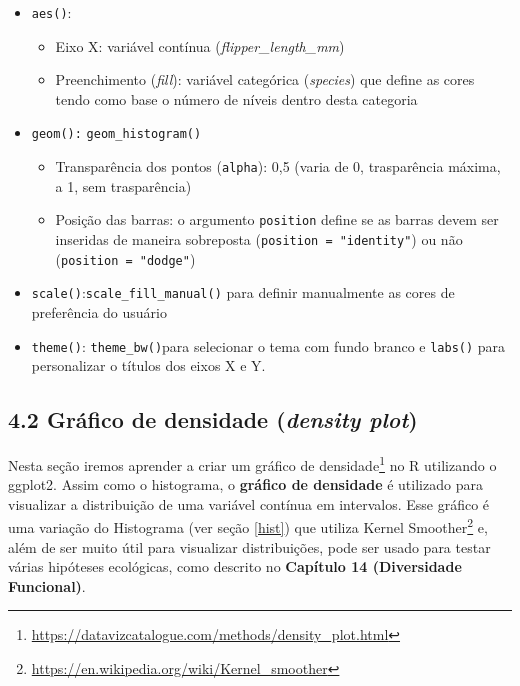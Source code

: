 \documentclass[
]{book}
\renewcommand{\href}[2]{#2\footnote{\url{#1}}}
\begin{document}
\begin{itemize}
\item
  \texttt{aes()}:

  \begin{itemize}
  \item
    Eixo X: variável contínua (\emph{flipper\_length\_mm})
  \item
    Preenchimento (\emph{fill}): variável categórica (\emph{species}) que define as cores tendo como base o número de níveis dentro desta categoria
  \end{itemize}
\item
  \texttt{geom():} \texttt{geom\_histogram()}

  \begin{itemize}
  \item
    Transparência dos pontos (\texttt{alpha}): 0,5 (varia de 0, trasparência máxima, a 1, sem trasparência)
  \item
    Posição das barras: o argumento \texttt{position} define se as barras devem ser inseridas de maneira sobreposta (\texttt{position\ =\ "identity"}) ou não (\texttt{position\ =\ "dodge"})
  \end{itemize}
\item
  \texttt{scale()}:\texttt{scale\_fill\_manual()} para definir manualmente as cores de preferência do usuário
\item
  \texttt{theme()}: \texttt{theme\_bw()}para selecionar o tema com fundo branco e \texttt{labs()} para personalizar o títulos dos eixos X e Y.
\end{itemize}

\hypertarget{gruxe1fico-de-densidade-density-plot}{%
\subsection{\texorpdfstring{4.2 Gráfico de densidade (\emph{density plot})}{4.2 Gráfico de densidade (density plot)}}\label{gruxe1fico-de-densidade-density-plot}}

Nesta seção iremos aprender a criar um \href{https://datavizcatalogue.com/methods/density_plot.html}{gráfico de densidade} no R utilizando o ggplot2. Assim como o histograma, o \textbf{gráfico de densidade} é utilizado para visualizar a distribuição de uma variável contínua em intervalos. Esse gráfico é uma variação do Histograma (ver seção \ref{hist}) que utiliza \href{https://en.wikipedia.org/wiki/Kernel_smoother}{Kernel Smoother} e, além de ser muito útil para visualizar distribuições, pode ser usado para testar várias hipóteses ecológicas, como descrito no \textbf{Capítulo 14 (Diversidade Funcional)}.
\end{document}
